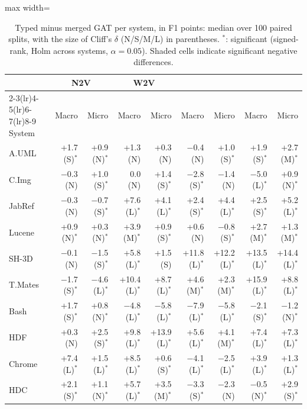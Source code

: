 \begin{table}[!htb]
\centering\small
\caption{Typed minus merged GAT per system, in F1 points: median over 100 paired splits, with the size of Cliff's $\delta$ (N/S/M/L) in parentheses. $^{*}$: significant (signed-rank, Holm across systems, $\alpha=0.05$). Shaded cells indicate significant negative differences.\label{tab:gat_typed_persystem}}
\begin{adjustbox}{max width=\textwidth}
\begin{tabular}{lrrrrrrrr}
\toprule
& \multicolumn{2}{c}{N2V} & \multicolumn{2}{c}{W2V} & \multicolumn{2}{c}{\zs{}} & \multicolumn{2}{c}{\ft{}} \\
\cmidrule(lr){2-3}\cmidrule(lr){4-5}\cmidrule(lr){6-7}\cmidrule(lr){8-9}
System & Macro & Micro & Macro & Micro & Macro & Micro & Macro & Micro \\
\midrule
A.UML & +1.7 (S)$^{*}$ & +0.9 (N)$^{*}$ & +1.3 (N) & +0.3 (N) & $-$0.4 (N) & +1.0 (S)$^{*}$ & +1.9 (S)$^{*}$ & +2.7 (M)$^{*}$ \\
C.Img & $-$0.3 (N) & +1.0 (S)$^{*}$ & 0.0 (N) & +1.4 (S)$^{*}$ & \cellcolor{gray!20}$-$2.8 (S)$^{*}$ & $-$1.4 (N) & \cellcolor{gray!20}$-$5.0 (L)$^{*}$ & +0.9 (N)$^{*}$ \\
JabRef & $-$0.3 (N) & \cellcolor{gray!20}$-$0.7 (S)$^{*}$ & +7.6 (L)$^{*}$ & +4.1 (L)$^{*}$ & +2.4 (S)$^{*}$ & +4.4 (L)$^{*}$ & +2.5 (S)$^{*}$ & +5.2 (L)$^{*}$ \\
Lucene & +0.9 (N)$^{*}$ & +0.3 (N)$^{*}$ & +3.9 (M)$^{*}$ & +0.9 (S)$^{*}$ & +0.6 (N) & \cellcolor{gray!20}$-$0.8 (S)$^{*}$ & +2.7 (M)$^{*}$ & +1.3 (M)$^{*}$ \\
SH-3D & $-$0.1 (N) & \cellcolor{gray!20}$-$1.5 (S)$^{*}$ & +5.8 (L)$^{*}$ & +1.5 (S) & +11.8 (L)$^{*}$ & +12.2 (L)$^{*}$ & +13.5 (L)$^{*}$ & +14.4 (L)$^{*}$ \\
T.Mates & \cellcolor{gray!20}$-$1.7 (S)$^{*}$ & \cellcolor{gray!20}$-$4.6 (L)$^{*}$ & +10.4 (L)$^{*}$ & +8.7 (L)$^{*}$ & +4.6 (M)$^{*}$ & +2.3 (M)$^{*}$ & +15.9 (L)$^{*}$ & +8.8 (L)$^{*}$ \\
Bash & +1.7 (S)$^{*}$ & +0.8 (N)$^{*}$ & \cellcolor{gray!20}$-$4.8 (L)$^{*}$ & \cellcolor{gray!20}$-$5.8 (L)$^{*}$ & \cellcolor{gray!20}$-$7.9 (L)$^{*}$ & \cellcolor{gray!20}$-$5.8 (L)$^{*}$ & \cellcolor{gray!20}$-$2.1 (S)$^{*}$ & \cellcolor{gray!20}$-$1.2 (N)$^{*}$ \\
HDF & +0.3 (N) & +2.5 (S)$^{*}$ & +9.8 (L)$^{*}$ & +13.9 (L)$^{*}$ & +5.6 (L)$^{*}$ & +4.1 (M)$^{*}$ & +7.4 (L)$^{*}$ & +7.3 (L)$^{*}$ \\
Chrome & +7.4 (L)$^{*}$ & +1.5 (L)$^{*}$ & +8.5 (L)$^{*}$ & +0.6 (S)$^{*}$ & \cellcolor{gray!20}$-$4.1 (L)$^{*}$ & \cellcolor{gray!20}$-$2.5 (L)$^{*}$ & +3.9 (L)$^{*}$ & +1.3 (L)$^{*}$ \\
HDC & +2.1 (S)$^{*}$ & +1.1 (N)$^{*}$ & +5.7 (L)$^{*}$ & +3.5 (M)$^{*}$ & \cellcolor{gray!20}$-$3.3 (S)$^{*}$ & $-$2.3 (N) & \cellcolor{gray!20}$-$0.5 (N)$^{*}$ & +2.9 (S)$^{*}$ \\
\bottomrule
\end{tabular}
\end{adjustbox}
\end{table}